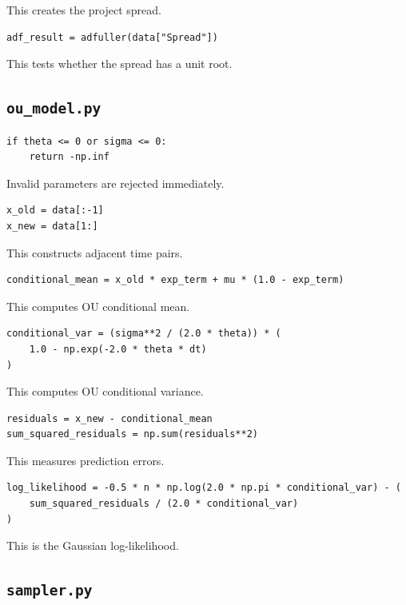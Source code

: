 \documentclass[11pt]{article}
\newcommand{\code}[1]{\texttt{#1}}
\begin{document}
This creates the project spread.

\begin{lstlisting}[style=pythonstyle]
adf_result = adfuller(data["Spread"])
\end{lstlisting}

This tests whether the spread has a unit root.

\subsection{\code{ou\_model.py}}

\begin{lstlisting}[style=pythonstyle]
if theta <= 0 or sigma <= 0:
    return -np.inf
\end{lstlisting}

Invalid parameters are rejected immediately.

\begin{lstlisting}[style=pythonstyle]
x_old = data[:-1]
x_new = data[1:]
\end{lstlisting}

This constructs adjacent time pairs.

\begin{lstlisting}[style=pythonstyle]
conditional_mean = x_old * exp_term + mu * (1.0 - exp_term)
\end{lstlisting}

This computes OU conditional mean.

\begin{lstlisting}[style=pythonstyle]
conditional_var = (sigma**2 / (2.0 * theta)) * (
    1.0 - np.exp(-2.0 * theta * dt)
)
\end{lstlisting}

This computes OU conditional variance.

\begin{lstlisting}[style=pythonstyle]
residuals = x_new - conditional_mean
sum_squared_residuals = np.sum(residuals**2)
\end{lstlisting}

This measures prediction errors.

\begin{lstlisting}[style=pythonstyle]
log_likelihood = -0.5 * n * np.log(2.0 * np.pi * conditional_var) - (
    sum_squared_residuals / (2.0 * conditional_var)
)
\end{lstlisting}

This is the Gaussian log-likelihood.

\subsection{\code{sampler.py}}
\end{document}
